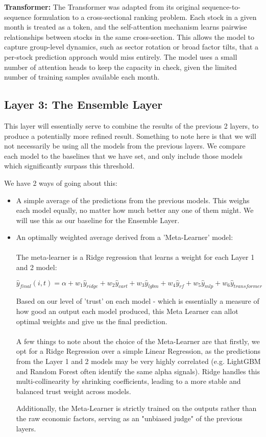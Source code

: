 \documentclass[11pt]{article}
\begin{document}
\textbf{Transformer:} The Transformer was adapted from its original sequence-to-sequence formulation to a cross-sectional ranking problem. Each stock in a given month is treated as a token, and the self-attention mechanism learns pairwise relationships between stocks in the same cross-section. This allows the model to capture group-level dynamics, such as sector rotation or broad factor tilts, that a per-stock prediction approach would miss entirely. The model uses a small number of attention heads to keep the capacity in check, given the limited number of training samples available each month.

\subsection{Layer 3: The Ensemble Layer}
This layer will essentially serve to combine the results of the previous 2 layers, to produce a potentially more refined result. Something to note here is that we will not necessarily be using all the models from the previous layers. We compare each model to the baselines that we have set, and only include those models which significantly surpass this threshold.

We have 2 ways of going about this:
\begin{itemize}
    \item A simple average of the predictions from the previous models. This weighs each model equally, no matter how much better any one of them might. We will use this as our baseline for the Ensemble Layer.
    \item An optimally weighted average derived from a 'Meta-Learner' model:\\
    \\
    The meta-learner is a Ridge regression that learns a weight for each Layer 1 and 2 model:

$$\hat{y}_{final}(i,t) = \alpha + w_1 \hat{y}_{ridge} + w_2 \hat{y}_{cart} + w_3 \hat{y}_{lgbm} + w_4 \hat{y}_{rf} + w_5 \hat{y}_{mlp} + w_6 \hat{y}_{transformer}$$

Based on our level of 'trust' on each model - which is essentially a measure of how good an output each model produced, this Meta Learner can allot optimal weights and give us the final prediction. \\
\\
A few things to note about the choice of the Meta-Learner are that firstly, we opt for a Ridge Regression over a simple Linear Regression, as the predictions from the Layer 1 and 2 models may be very highly correlated (e.g. LightGBM and Random Forest often identify the same alpha signals). Ridge handles this multi-collinearity by shrinking coefficients, leading to a more stable and balanced trust weight across models.

    Additionally, the Meta-Learner is strictly trained on the outputs rather than the raw economic factors, serving as an "unbiased judge" of the previous layers.
\end{itemize}
\end{document}
